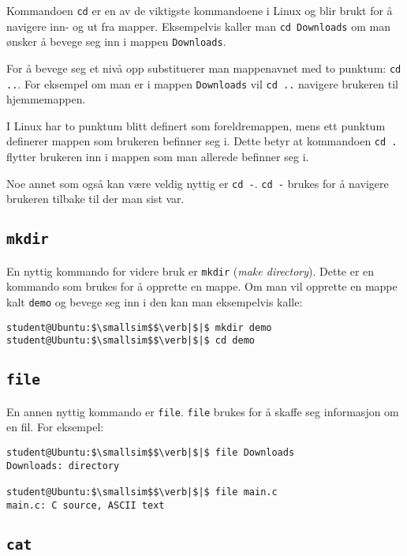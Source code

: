 \begin{alphasection}
Kommandoen \verb|cd| er en av de viktigste kommandoene i Linux og blir brukt for å navigere inn- og ut fra mapper. Eksempelvis kaller man \verb|cd Downloads| om man ønsker å bevege seg inn i mappen \verb|Downloads|.

For å bevege seg et nivå opp substituerer man mappenavnet med to punktum: \verb|cd ..|. For eksempel om man er i mappen \verb|Downloads| vil \verb|cd ..| navigere brukeren til hjemmemappen.

I Linux har to punktum blitt definert som foreldremappen, mens ett punktum definerer mappen som brukeren befinner seg i. Dette betyr at kommandoen \verb|cd .| flytter brukeren inn i mappen som man allerede befinner seg i.

Noe annet som også kan være veldig nyttig er \verb|cd -|. \verb|cd -| brukes for å navigere brukeren tilbake til der man sist var. 

\cprotect\subsection{\lstinline{mkdir}}
En nyttig kommando for videre bruk er \verb|mkdir| (\textit{make directory}). Dette er en kommando som brukes for å opprette en mappe. Om man vil opprette en mappe kalt \verb|demo| og bevege seg inn i den kan man eksempelvis
 kalle:

\begin{lstlisting}[mathescape=true]
student@Ubuntu:$\smallsim$$\verb|$|$ mkdir demo
student@Ubuntu:$\smallsim$$\verb|$|$ cd demo
\end{lstlisting}




\cprotect\subsection{\lstinline{file}}

En annen nyttig kommando er \verb|file|. \verb|file| brukes for å skaffe seg informasjon om en fil. For eksempel:

\begin{lstlisting}[mathescape=true]
student@Ubuntu:$\smallsim$$\verb|$|$ file Downloads
Downloads: directory

student@Ubuntu:$\smallsim$$\verb|$|$ file main.c
main.c: C source, ASCII text
\end{lstlisting}



\cprotect\subsection{\lstinline{cat}}


\end{alphasection}
